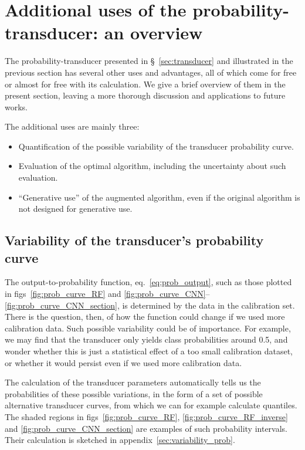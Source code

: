 \documentclass[\ifafour a4paper,12pt,\else a5paper,10pt,\fi%
onecolumn,oneside,article,%
british%
]{memoir}
\theoremstyle{remark}
\theoremstyle{innote}
\renewcommand*{\|}[1][]{\nonscript\:#1\vert\nonscript\:\mathopen{}}
\newcommand*{\sect}{\S}%
\newcommand*{\eqn}{eq.}%
\newcommand*{\figs}{figs}%
\begin{document}
\section{Additional uses of the probability-transducer: an overview}
\label{sec:overview_other_uses}

The probability-transducer presented in \sect~\ref{sec:transducer} and illustrated in the previous section has several other uses and advantages, all of which come for free or almost for free with its calculation. We give a brief overview of them in the present section, leaving a more thorough discussion and applications to future works.

The additional uses are mainly three:
\begin{itemize}
\item Quantification of the possible variability of the transducer probability curve.
\item Evaluation of the optimal algorithm, including the uncertainty about such evaluation.
\item \enquote{Generative use} of the augmented algorithm, even if the original algorithm is not designed for generative use.
\end{itemize}

\subsection{Variability of the transducer's probability curve}
\label{sec:variability_curve}

The output-to-probability function, \eqn~\eqref{eq:prob_output}, such as those plotted in \figs~\ref{fig:prob_curve_RF} and \ref{fig:prob_curve_CNN}--\ref{fig:prob_curve_CNN_section}, is determined by the data in the calibration set. There is the question, then, of how the function could change if we used more calibration data. Such possible variability could be of importance. For example, we may find that the transducer only yields class probabilities around 0.5, and wonder whether this is just a statistical effect of a too small calibration dataset, or whether it would persist even if we used more calibration data.

The calculation of the transducer parameters automatically tells us the probabilities of these possible variations, in the form of  a set of possible alternative transducer curves, from which we can for example calculate quantiles. The shaded regions in \figs~\ref{fig:prob_curve_RF}, \ref{fig:prob_curve_RF_inverse} and \ref{fig:prob_curve_CNN_section} are examples of such probability intervals. Their calculation is sketched in appendix~\ref{sec:variability_prob}.
\end{document}
